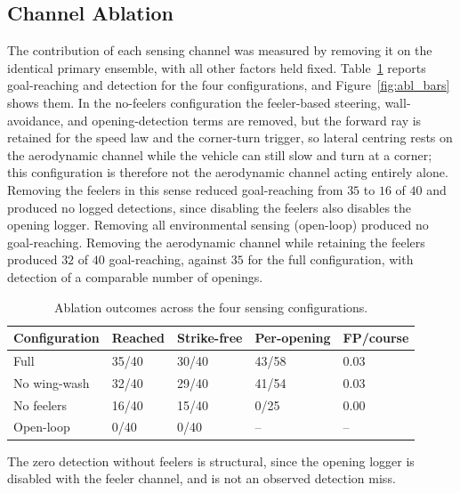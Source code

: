 \documentclass[final,5p,times]{elsarticle}
\begin{document}
\subsection{Channel Ablation}
\label{sec:results_ablation}

The contribution of each sensing channel was measured by removing it on the identical primary ensemble, with all other factors held fixed. Table~\ref{tab:ablation} reports goal-reaching and detection for the four configurations, and Figure~\ref{fig:abl_bars} shows them. In the no-feelers configuration the feeler-based steering, wall-avoidance, and opening-detection terms are removed, but the forward ray is retained for the speed law and the corner-turn trigger, so lateral centring rests on the aerodynamic channel while the vehicle can still slow and turn at a corner; this configuration is therefore not the aerodynamic channel acting entirely alone. Removing the feelers in this sense reduced goal-reaching from $35$ to $16$ of $40$ and produced no logged detections, since disabling the feelers also disables the opening logger. Removing all environmental sensing (open-loop) produced no goal-reaching. Removing the aerodynamic channel while retaining the feelers produced $32$ of $40$ goal-reaching, against $35$ for the full configuration, with detection of a comparable number of openings.

\begin{table}[t]
\centering
\begin{threeparttable}
\caption{Ablation outcomes across the four sensing configurations.}
\label{tab:ablation}
\footnotesize\setlength{\tabcolsep}{3pt}
\begin{tabular*}{\columnwidth}{@{\extracolsep{\fill}}lllll@{}}
\toprule
Configuration & Reached & Strike-free & Per-opening & FP/course \\
\midrule
Full & 35/40 & 30/40 & 43/58 & 0.03 \\
No wing-wash & 32/40 & 29/40 & 41/54 & 0.03 \\
No feelers & 16/40 & 15/40 & 0/25\tnote{a} & 0.00 \\
Open-loop & 0/40 & 0/40 & -- & -- \\
\bottomrule
\end{tabular*}
\begin{tablenotes}\footnotesize
\item[a] The zero detection without feelers is structural, since the opening logger is disabled with the feeler channel, and is not an observed detection miss.
\end{tablenotes}
\end{threeparttable}
\end{table}
\end{document}
